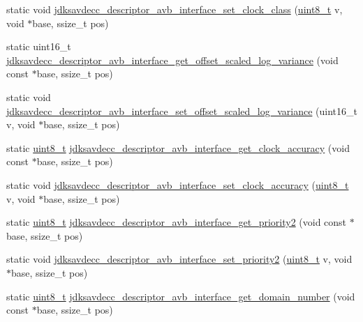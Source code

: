 \begin{DoxyCompactItemize}
\item 
static void \hyperlink{group__descriptor__avb__interface_ga892bbe1945ab01425e30b366ef8c3a21}{jdksavdecc\+\_\+descriptor\+\_\+avb\+\_\+interface\+\_\+set\+\_\+clock\+\_\+class} (\hyperlink{stdint_8h_aba7bc1797add20fe3efdf37ced1182c5}{uint8\+\_\+t} v, void $\ast$base, ssize\+\_\+t pos)
\item 
static uint16\+\_\+t \hyperlink{group__descriptor__avb__interface_ga306ccea60de25ddc70c03ecece03ab8b}{jdksavdecc\+\_\+descriptor\+\_\+avb\+\_\+interface\+\_\+get\+\_\+offset\+\_\+scaled\+\_\+log\+\_\+variance} (void const $\ast$base, ssize\+\_\+t pos)
\item 
static void \hyperlink{group__descriptor__avb__interface_ga163f4e08eb77026f3c93eabd9efbd5a5}{jdksavdecc\+\_\+descriptor\+\_\+avb\+\_\+interface\+\_\+set\+\_\+offset\+\_\+scaled\+\_\+log\+\_\+variance} (uint16\+\_\+t v, void $\ast$base, ssize\+\_\+t pos)
\item 
static \hyperlink{stdint_8h_aba7bc1797add20fe3efdf37ced1182c5}{uint8\+\_\+t} \hyperlink{group__descriptor__avb__interface_ga039cb9a8f62227783caacf966490eda9}{jdksavdecc\+\_\+descriptor\+\_\+avb\+\_\+interface\+\_\+get\+\_\+clock\+\_\+accuracy} (void const $\ast$base, ssize\+\_\+t pos)
\item 
static void \hyperlink{group__descriptor__avb__interface_ga717343484db4c8c6f0de57dc7025a2fa}{jdksavdecc\+\_\+descriptor\+\_\+avb\+\_\+interface\+\_\+set\+\_\+clock\+\_\+accuracy} (\hyperlink{stdint_8h_aba7bc1797add20fe3efdf37ced1182c5}{uint8\+\_\+t} v, void $\ast$base, ssize\+\_\+t pos)
\item 
static \hyperlink{stdint_8h_aba7bc1797add20fe3efdf37ced1182c5}{uint8\+\_\+t} \hyperlink{group__descriptor__avb__interface_gabccc737f11d15cec6ccce06a85f83a74}{jdksavdecc\+\_\+descriptor\+\_\+avb\+\_\+interface\+\_\+get\+\_\+priority2} (void const $\ast$base, ssize\+\_\+t pos)
\item 
static void \hyperlink{group__descriptor__avb__interface_ga3c7cf7ee22623519b430421f9f3d21ac}{jdksavdecc\+\_\+descriptor\+\_\+avb\+\_\+interface\+\_\+set\+\_\+priority2} (\hyperlink{stdint_8h_aba7bc1797add20fe3efdf37ced1182c5}{uint8\+\_\+t} v, void $\ast$base, ssize\+\_\+t pos)
\item 
static \hyperlink{stdint_8h_aba7bc1797add20fe3efdf37ced1182c5}{uint8\+\_\+t} \hyperlink{group__descriptor__avb__interface_ga2712c7c6fd90c32f1cb9be9585bec15f}{jdksavdecc\+\_\+descriptor\+\_\+avb\+\_\+interface\+\_\+get\+\_\+domain\+\_\+number} (void const $\ast$base, ssize\+\_\+t pos)
\item 

\end{DoxyCompactItemize}
